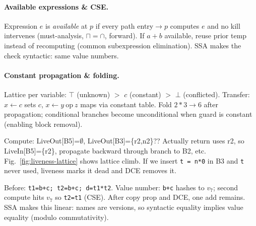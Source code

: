 \paragraph{Available expressions \& CSE.} Expression $e$ is \emph{available} at $p$ if every path entry$\to p$ computes $e$ and no kill intervenes (must-analysis, $\sqcap=\cap$, forward). If $a+b$ available, reuse prior temp instead of recomputing (common subexpression elimination). SSA makes the check syntactic: same value numbers.

\paragraph{Constant propagation \& folding.} Lattice per variable: $\top$ (unknown) $>$ $c$ (constant) $>$ $\bot$ (conflicted). Transfer: $x\gets c$ sets $c$, $x\gets y\ \text{op}\ z$ maps via constant table. Fold $2*3\to6$ after propagation; conditional branches become unconditional when guard is constant (enabling block removal).

\begin{example}
Compute: LiveOut[B5]=$\emptyset$, LiveOut[B3]=\{r2,n2\}?? Actually return uses r2, so LiveIn[B5]=\{r2\}, propagate backward through branch to B2, etc. Fig.~\ref{fig:liveness-lattice} shows lattice climb. If we insert \texttt{t = n*0} in B3 and \texttt{t} never used, liveness marks it dead and DCE removes it.
\end{example}

\begin{example}
Before: \texttt{t1=b+c; t2=b+c; d=t1*t2}. Value number: \texttt{b+c} hashes to $v_7$; second compute hits $v_7$ so \texttt{t2=t1} (CSE). After copy prop and DCE, one add remains. SSA makes this linear: names are versions, so syntactic equality implies value equality (modulo commutativity).
\end{example}

